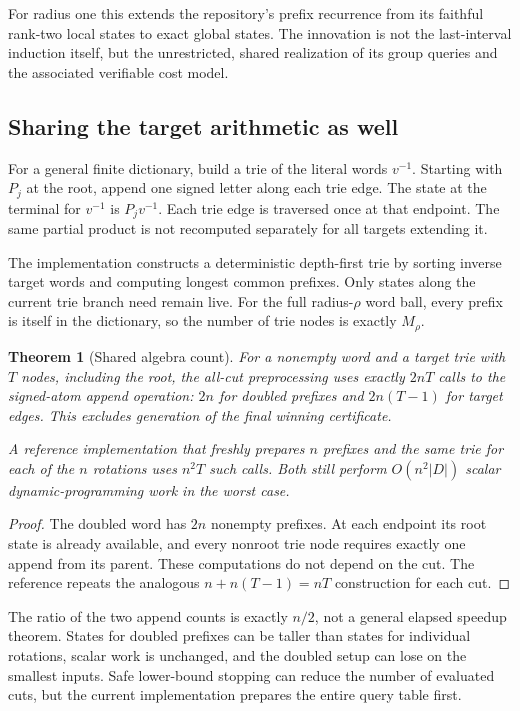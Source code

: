 \documentclass[11pt,a4paper]{article}
\newtheorem{theorem}{Theorem}[section]
\theoremstyle{definition}\newtheorem{definition}[theorem]{Definition}
\theoremstyle{remark}\newtheorem{remark}[theorem]{Remark}
\begin{document}
For radius one this extends the repository's prefix recurrence from its
faithful rank-two local states to exact global states. The innovation is
not the last-interval induction itself, but the unrestricted, shared
realization of its group queries and the associated verifiable cost model.

\subsection{Sharing the target arithmetic as well}
For a general finite dictionary, build a trie of the literal words $v^{-1}$.
Starting with $P_j$ at the root, append one signed letter along each trie
edge. The state at the terminal for $v^{-1}$ is $P_jv^{-1}$. Each trie edge
is traversed once at that endpoint. The same partial product is not
recomputed separately for all targets extending it.

The implementation constructs a deterministic depth-first trie by sorting
inverse target words and computing longest common prefixes. Only states
along the current trie branch need remain live. For the full radius-$\rho$
word ball, every prefix is itself in the dictionary, so the number of trie
nodes is exactly $M_\rho$.

\begin{theorem}[Shared algebra count]\label{thm:sharedcount}
For a nonempty word and a target trie with $T$ nodes, including the root,
the all-cut preprocessing uses exactly $2nT$ calls to the signed-atom
append operation: $2n$ for doubled prefixes and $2n(T-1)$ for target edges.
This excludes generation of the final winning certificate.

A reference implementation that freshly prepares $n$ prefixes and the same
trie for each of the $n$ rotations uses $n^2T$ such calls. Both still perform
$O(n^2|D|)$ scalar dynamic-programming work in the worst case.
\end{theorem}
\begin{proof}
The doubled word has $2n$ nonempty prefixes. At each endpoint its root state
is already available, and every nonroot trie node requires exactly one
append from its parent. These computations do not depend on the cut. The
reference repeats the analogous $n+n(T-1)=nT$ construction for each cut.
\end{proof}

The ratio of the two append counts is exactly $n/2$, not a general elapsed
speedup theorem. States for doubled prefixes can be taller than states for
individual rotations, scalar work is unchanged, and the doubled setup can
lose on the smallest inputs. Safe lower-bound stopping can reduce the
number of evaluated cuts, but the current implementation prepares the
entire query table first.
\end{document}
